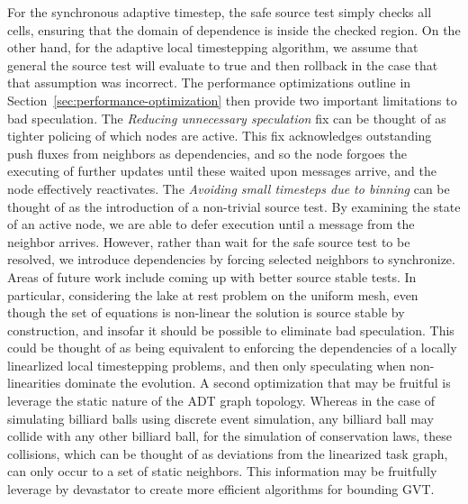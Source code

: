 For the synchronous adaptive timestep, the safe source test simply checks all cells, ensuring that the domain of dependence is inside the checked region. On the other hand, for the adaptive local timestepping algorithm, we assume that general the source test will evaluate to true and then rollback in the case that that assumption was incorrect. The performance optimizations outline in Section~\ref{sec:performance-optimization} then provide two important limitations to bad speculation. The {\em Reducing unnecessary speculation} fix can be thought of as tighter policing of which nodes are active. This fix acknowledges outstanding push fluxes from neighbors as dependencies, and so the node forgoes the executing of further updates until these waited upon messages arrive, and the node effectively reactivates. The {\em Avoiding small timesteps due to binning} can be thought of as the introduction of a non-trivial source test. By examining the state of an active node, we are able to defer execution until a message from the neighbor arrives. However, rather than wait for the safe source test to be resolved, we introduce dependencies by forcing selected neighbors to synchronize. 
Areas of future work include coming up with better source stable tests. In particular, considering the lake at rest problem on the uniform mesh, even though the set of equations is non-linear the solution is source stable by construction, and insofar it should be possible to eliminate bad speculation. This could be thought of as being equivalent to enforcing the dependencies of a locally linearlized local timestepping problems, and then only speculating when non-linearities dominate the evolution. A second optimization that may be fruitful is leverage the static nature of the ADT graph topology. Whereas in the case of simulating billiard balls using discrete event simulation, any billiard ball may collide with any other billiard ball, for the simulation of conservation laws, these collisions, which can be thought of as deviations from the linearized task graph, can only occur to a set of static neighbors. This information may be fruitfully leverage by devastator to create more efficient algorithms for bounding GVT.



